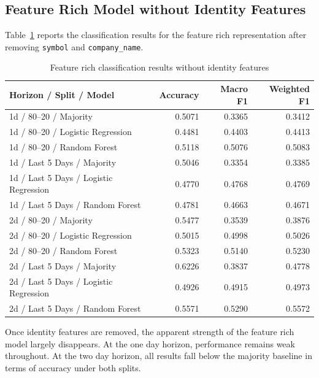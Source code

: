 \subsection{Feature Rich Model without Identity Features}

Table~\ref{tab:cls_without_identity} reports the classification results for the feature rich representation after removing \texttt{symbol} and \texttt{company\_name}.

\begin{table}[htbp]
\centering
\caption{Feature rich classification results without identity features}
\label{tab:cls_without_identity}
\begin{tabular}{llrrr}
\hline
\textbf{Horizon / Split / Model} & \textbf{} & \textbf{Accuracy} & \textbf{Macro F1} & \textbf{Weighted F1} \\
\hline
1d / 80--20 / Majority &  & 0.5071 & 0.3365 & 0.3412 \\
1d / 80--20 / Logistic Regression &  & 0.4481 & 0.4403 & 0.4413 \\
1d / 80--20 / Random Forest &  & 0.5118 & 0.5076 & 0.5083 \\
\hline
1d / Last 5 Days / Majority &  & 0.5046 & 0.3354 & 0.3385 \\
1d / Last 5 Days / Logistic Regression &  & 0.4770 & 0.4768 & 0.4769 \\
1d / Last 5 Days / Random Forest &  & 0.4781 & 0.4663 & 0.4671 \\
\hline
2d / 80--20 / Majority &  & 0.5477 & 0.3539 & 0.3876 \\
2d / 80--20 / Logistic Regression &  & 0.5015 & 0.4998 & 0.5026 \\
2d / 80--20 / Random Forest &  & 0.5323 & 0.5140 & 0.5230 \\
\hline
2d / Last 5 Days / Majority &  & 0.6226 & 0.3837 & 0.4778 \\
2d / Last 5 Days / Logistic Regression &  & 0.4926 & 0.4915 & 0.4973 \\
2d / Last 5 Days / Random Forest &  & 0.5571 & 0.5290 & 0.5572 \\
\hline
\end{tabular}
\end{table}

Once identity features are removed, the apparent strength of the feature rich model largely disappears. At the one day horizon, performance remains weak throughout. At the two day horizon, all results fall below the majority baseline in terms of accuracy under both splits.

